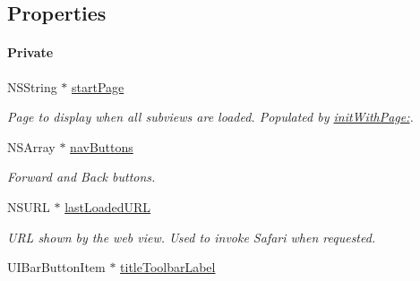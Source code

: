 \subsection*{Properties}
\begin{Indent}\paragraph*{Private}
\begin{DoxyCompactItemize}
\item 
\hypertarget{interface_p_c_web_view_controller_adac96c9026f42daf02a3a3e568f2211c}{
NSString $\ast$ \hyperlink{interface_p_c_web_view_controller_adac96c9026f42daf02a3a3e568f2211c}{startPage}}
\label{interface_p_c_web_view_controller_adac96c9026f42daf02a3a3e568f2211c}

\begin{DoxyCompactList}\small\item\em Page to display when all subviews are loaded. Populated by \hyperlink{interface_p_c_web_view_controller_a2650e78e4a28fa64494e10bb8e4663f0}{initWithPage:}. \end{DoxyCompactList}\item 
\hypertarget{interface_p_c_web_view_controller_a069fec1bd1a88702e1baeed1db0d61c5}{
NSArray $\ast$ \hyperlink{interface_p_c_web_view_controller_a069fec1bd1a88702e1baeed1db0d61c5}{navButtons}}
\label{interface_p_c_web_view_controller_a069fec1bd1a88702e1baeed1db0d61c5}

\begin{DoxyCompactList}\small\item\em Forward and Back buttons. \end{DoxyCompactList}\item 
\hypertarget{interface_p_c_web_view_controller_addddb1fa3081c063e95d5eae3676bddc}{
NSURL $\ast$ \hyperlink{interface_p_c_web_view_controller_addddb1fa3081c063e95d5eae3676bddc}{lastLoadedURL}}
\label{interface_p_c_web_view_controller_addddb1fa3081c063e95d5eae3676bddc}

\begin{DoxyCompactList}\small\item\em URL shown by the web view. Used to invoke Safari when requested. \end{DoxyCompactList}\item 
\hypertarget{interface_p_c_web_view_controller_ae1194ea1b9a2504c646c1bc8c965295f}{
UIBarButtonItem $\ast$ \hyperlink{interface_p_c_web_view_controller_ae1194ea1b9a2504c646c1bc8c965295f}{titleToolbarLabel}}
\label{interface_p_c_web_view_controller_ae1194ea1b9a2504c646c1bc8c965295f}


\end{DoxyCompactItemize}
\end{Indent}
